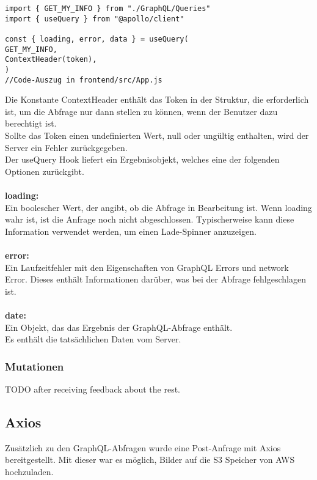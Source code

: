 \begin{lstlisting}
import { GET_MY_INFO } from "./GraphQL/Queries"
import { useQuery } from "@apollo/client"

const { loading, error, data } = useQuery(
GET_MY_INFO,
ContextHeader(token),
)
//Code-Auszug in frontend/src/App.js

\end{lstlisting}
Die Konstante ContextHeader enthält das Token in der Struktur, die erforderlich ist, um die Abfrage nur dann stellen zu können, wenn der Benutzer dazu berechtigt ist.
\\
Sollte das Token einen undefinierten Wert, null oder ungültig enthalten, wird der Server ein Fehler zurückgegeben.
\\
Der useQuery Hook liefert ein Ergebnisobjekt, welches eine der folgenden Optionen zurückgibt.
\\\\
\textbf{loading:}\\
Ein boolescher Wert, der angibt, ob die Abfrage in Bearbeitung ist.
Wenn loading wahr ist, ist die Anfrage noch nicht abgeschlossen. Typischerweise kann diese Information verwendet werden, um einen Lade-Spinner anzuzeigen.
\\\\
\textbf{error:}\\
Ein Laufzeitfehler mit den Eigenschaften von GraphQL Errors und network Error.
Dieses enthält Informationen darüber, was bei der Abfrage fehlgeschlagen  ist.
\\\\
\textbf{date:}\\
Ein Objekt, das das Ergebnis der GraphQL-Abfrage enthält.
\\Es enthält die tatsächlichen Daten vom Server.
\\
\newpage

\subsubsection{Mutationen}
TODO after receiving feedback about the rest.

\newpage
\subsection{Axios}
Zusätzlich zu den GraphQL-Abfragen wurde eine Post-Anfrage mit Axios bereitgestellt.
Mit dieser war es möglich, Bilder auf die S3 Speicher von AWS hochzuladen.

